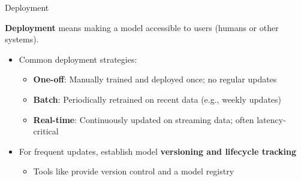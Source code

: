 \documentclass[10pt,compress,t,notes=noshow, xcolor=table]{beamer}
\begin{document}

\begin{frame}{Deployment}
\label{deployment}

\textbf{Deployment} means making a model accessible to users (humans or other systems).

\vspace{0.5em}
\begin{itemize}
  \item Common deployment strategies:
    \begin{itemize}
      \item \textbf{One-off}: Manually trained and deployed once; no regular updates
      \item \textbf{Batch}: Periodically retrained on recent data (e.g., weekly updates)
      \item \textbf{Real-time}: Continuously updated on streaming data; often latency-critical
    \end{itemize}
  \item For frequent updates, establish model \textbf{versioning and lifecycle tracking}
    \begin{itemize}
      \item Tools like  provide version control and a model registry
    \end{itemize}
\end{itemize}
\end{frame}
\end{document}
